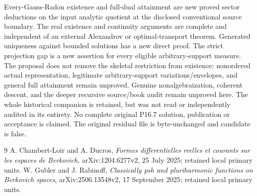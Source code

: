 \documentclass[11pt]{article}
\begin{document}
Every-Gauss-Radon existence and full-dual attainment are new proved
sector deductions on the input analytic quotient at the disclosed
conventional source boundary. The real existence and continuity
arguments are complete and independent of an external Alexandrov or
optimal-transport theorem. Generated uniqueness against bounded
solutions has a new direct proof. The strict projection gap is a
new assertion for every eligible arbitrary-support measure.
The proposal does not remove the skeletal restriction from existence:
nonordered actual representation, legitimate arbitrary-support
variations/envelopes, and general full attainment remain unproved.
Genuine nonalgebraization, coherent descent, and the deeper recursive
source/book audit remain unproved here. The whole historical companion
is retained, but was not read or independently audited in its entirety.
No complete original P16.7 solution, publication or acceptance is
claimed. The original residual file is byte-unchanged and candidate
is false.

\begin{thebibliography}{9}
 A. Chambert-Loir and A. Ducros, \emph{Formes differentielles
reelles et courants sur les espaces de Berkovich}, arXiv:1204.6277v2,
25 July 2025; retained local primary units.
 W. Gubler and J. Rabinoff, \emph{Classically psh and
pluriharmonic functions on Berkovich spaces}, arXiv:2506.13548v2,
17 September 2025; retained local primary units.
\end{thebibliography}
\end{document}
